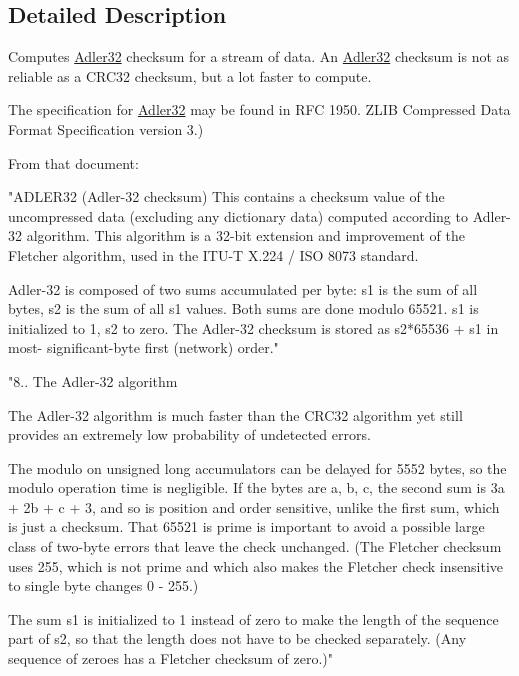 \subsection{Detailed Description}
Computes \hyperlink{class_i_c_sharp_code_1_1_sharp_zip_lib_1_1_checksums_1_1_adler32}{Adler32} checksum for a stream of data. An \hyperlink{class_i_c_sharp_code_1_1_sharp_zip_lib_1_1_checksums_1_1_adler32}{Adler32} checksum is not as reliable as a C\+R\+C32 checksum, but a lot faster to compute. 

The specification for \hyperlink{class_i_c_sharp_code_1_1_sharp_zip_lib_1_1_checksums_1_1_adler32}{Adler32} may be found in R\+FC 1950. Z\+L\+IB Compressed Data Format Specification version 3.)

From that document\+: \begin{DoxyVerb} "ADLER32 (Adler-32 checksum)
  This contains a checksum value of the uncompressed data
  (excluding any dictionary data) computed according to Adler-32
  algorithm. This algorithm is a 32-bit extension and improvement
  of the Fletcher algorithm, used in the ITU-T X.224 / ISO 8073
  standard.

  Adler-32 is composed of two sums accumulated per byte: s1 is
  the sum of all bytes, s2 is the sum of all s1 values. Both sums
  are done modulo 65521. s1 is initialized to 1, s2 to zero.  The
  Adler-32 checksum is stored as s2*65536 + s1 in most-
  significant-byte first (network) order."
\end{DoxyVerb}


"8.. The Adler-\/32 algorithm

The Adler-\/32 algorithm is much faster than the C\+R\+C32 algorithm yet still provides an extremely low probability of undetected errors.

The modulo on unsigned long accumulators can be delayed for 5552 bytes, so the modulo operation time is negligible. If the bytes are a, b, c, the second sum is 3a + 2b + c + 3, and so is position and order sensitive, unlike the first sum, which is just a checksum. That 65521 is prime is important to avoid a possible large class of two-\/byte errors that leave the check unchanged. (The Fletcher checksum uses 255, which is not prime and which also makes the Fletcher check insensitive to single byte changes 0 -\/ 255.)

The sum s1 is initialized to 1 instead of zero to make the length of the sequence part of s2, so that the length does not have to be checked separately. (Any sequence of zeroes has a Fletcher checksum of zero.)" 


